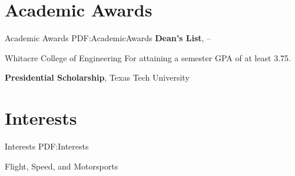 \documentclass[a4paper,10pt,oneside]{article}
\begin{document}
\begin{body}

\section
{Academic Awards}
{Academic Awards}
{PDF:AcademicAwards}
{\textbf{Dean's List}},
\hfill
{} --
\begin{detail}
\Item
Whitacre College of Engineering
\Item
For attaining a semester GPA of at least 3.75.
\end{detail}


{\textbf{Presidential Scholarship}},
Texas Tech University
\hfill
{}
\begin{detail}

\end{detail}






\section
{Interests}
{Interests}
{PDF:Interests}

Flight, Speed, and Motorsports

\end{body}
\end{document}
